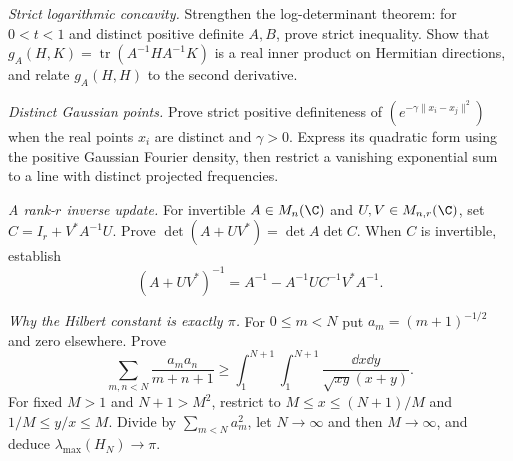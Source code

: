 \begin{exercise}[$\star\star$]\label{ex:v8cEa}
\emph{Strict logarithmic concavity.} Strengthen the log-determinant theorem: for $0<t<1$ and distinct positive definite $A,B$, prove strict inequality. Show that $g_A(H,K)=\operatorname{tr}(A^{-1}HA^{-1}K)$ is a real inner product on Hermitian directions, and relate $g_A(H,H)$ to the second derivative.
\end{exercise}
\begin{exercise}[$\star\star$]\label{ex:v8cEb}
\emph{Distinct Gaussian points.} Prove strict positive definiteness of $(e^{-\gamma\|x_i-x_j\|^2})$ when the real points $x_i$ are distinct and $\gamma>0$. Express its quadratic form using the positive Gaussian Fourier density, then restrict a vanishing exponential sum to a line with distinct projected frequencies.
\end{exercise}
\begin{exercise}[$\star\star$]\label{ex:v8cEc}
\emph{A rank-$r$ inverse update.} For invertible $A\in M_n(\C)$ and $U,V\in M_{n,r}(\C)$, set $C=I_r+V^*A^{-1}U$. Prove $\det(A+UV^*)=\det A\det C$. When $C$ is invertible, establish
\[(A+UV^*)^{-1}=A^{-1}-A^{-1}UC^{-1}V^*A^{-1}.\]
\end{exercise}
\begin{exercise}[$\star\star\star$]\label{ex:v8cEd}
\emph{Why the Hilbert constant is exactly $\pi$.} For $0\le m<N$ put $a_m=(m+1)^{-1/2}$ and zero elsewhere. Prove
\[\sum_{m,n<N}\frac{a_ma_n}{m+n+1}\ge\int_1^{N+1}\int_1^{N+1}\frac{\dd x\dd y}{\sqrt{xy}(x+y)}.\]
For fixed $M>1$ and $N+1>M^2$, restrict to $M\le x\le(N+1)/M$ and $1/M\le y/x\le M$. Divide by $\sum_{m<N}a_m^2$, let $N\to\infty$ and then $M\to\infty$, and deduce $\lambda_{\max}(H_N)\to\pi$.
\end{exercise}

